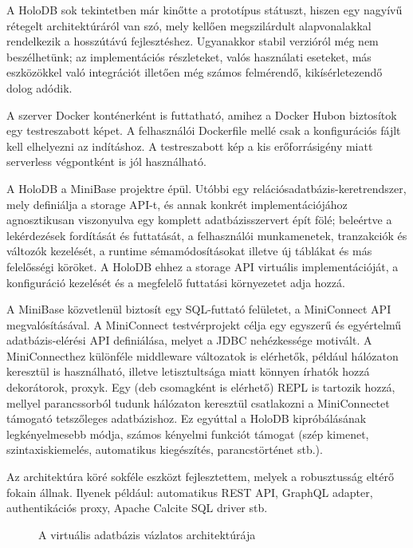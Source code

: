 \documentclass[
    parspace,
    noindent,
    nohyp,
]{elteiktdk}[2023/04/10]
\newcommand{\todoref}[1]{\todo[inline, noinlinepar, color=red, textcolor=white, inlinewidth=0.6cm, caption={#1}]{\large \textbf{×}}}
\begin{document}
A HoloDB sok tekintetben már kinőtte a prototípus státuszt,
hiszen egy nagyívű rétegelt architektúráról van szó,
mely kellően megszilárdult alapvonalakkal rendelkezik a hosszútávú fejlesztéshez.
Ugyanakkor stabil verzióról még nem beszélhetünk;
az implementációs részleteket, valós használati eseteket,
más eszközökkel való integrációt illetően még számos felmérendő, kikísérletezendő dolog adódik.

A szerver Docker konténerként is futtatható, amihez a Docker Hubon biztosítok egy testreszabott képet.
A felhasználói Dockerfile mellé csak a konfigurációs fájlt kell elhelyezni az indításhoz.
A testreszabott kép a kis erőforrásigény miatt serverless végpontként is jól használható.

A HoloDB a MiniBase projektre épül.
Utóbbi egy relációsadatbázis-keretrendszer, mely definiálja a storage API-t,
és annak konkrét implementációjához agnosztikusan viszonyulva
egy komplett adatbázisszervert épít fölé;
beleértve a lekérdezések fordítását és futtatását,
a felhasználói munkamenetek, tranzakciók és változók kezelését,
a runtime sémamódosításokat illetve új táblákat és más felelősségi köröket.
A HoloDB ehhez a storage API virtuális implementációját,
a konfiguráció kezelését
és a megfelelő futtatási környezetet adja hozzá.

A MiniBase közvetlenül biztosít egy SQL-futtató felületet, a MiniConnect API megvalósításával.
A MiniConnect testvérprojekt célja egy egyszerű és egyértelmű adatbázis-elérési API definiálása,
melyet a JDBC nehézkessége motivált.
A MiniConnecthez különféle middleware változatok is elérhetők, például hálózaton keresztül is használható,
illetve letisztultsága miatt könnyen írhatók hozzá dekorátorok, proxyk.
Egy (deb csomagként is elérhető) REPL\todoref{mi az a REPL?} is tartozik hozzá,
mellyel parancssorból tudunk hálózaton keresztül csatlakozni a MiniConnectet támogató tetszőleges adatbázishoz.
Ez egyúttal a HoloDB kipróbálásának legkényelmesebb módja,
számos kényelmi funkciót támogat
(szép kimenet, szintaxiskiemelés, automatikus kiegészítés, parancstörténet stb.).

Az architektúra köré sokféle eszközt fejlesztettem,
melyek a robusztusság eltérő fokain állnak.
Ilyenek például: automatikus REST API, GraphQL adapter, authentikációs proxy, Apache Calcite SQL driver stb.
\todoref{A toolokhoz valami leírást még}

\begin{figure}[H]
\centering

\caption{A virtuális adatbázis vázlatos architektúrája}
\end{figure}
\end{document}

